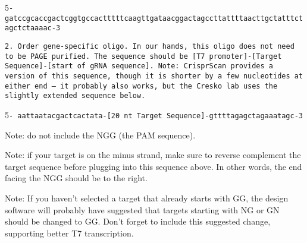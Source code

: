 \documentclass[
  letterpaper,
  DIV=11,
  numbers=noendperiod]{scrreprt}
\begin{document}
5\texttt{-gatccgcaccgactcggtgccactttttcaagttgataacggactagccttattttaacttgctatttctagctctaaaac-3}

\begin{verbatim}
2. Order gene-specific oligo. In our hands, this oligo does not need to be PAGE purified. The sequence should be [T7 promoter]-[Target Sequence]-[start of gRNA sequence]. Note: CrisprScan provides a version of this sequence, though it is shorter by a few nucleotides at either end – it probably also works, but the Cresko lab uses the slightly extended sequence below. 
\end{verbatim}

5\texttt{-\ aattaatacgactcactata-{[}20\ nt\ Target\ Sequence{]}-gttttagagctagaaatagc-3}

\begin{tcolorbox}[enhanced jigsaw, toprule=.15mm, breakable, coltitle=black, leftrule=.75mm, title=\textcolor{quarto-callout-note-color}{\faInfo}\hspace{0.5em}{Notes}, bottomrule=.15mm, toptitle=1mm, bottomtitle=1mm, colframe=quarto-callout-note-color-frame, opacityback=0, colback=white, opacitybacktitle=0.6, colbacktitle=quarto-callout-note-color!10!white, rightrule=.15mm, titlerule=0mm, arc=.35mm, left=2mm]

Note: do not include the NGG (the PAM sequence).

Note: if your target is on the minus strand, make sure to reverse
complement the target sequence before plugging into this sequence above.
In other words, the end facing the NGG should be to the right.

Note: If you haven't selected a target that already starts with GG, the
design software will probably have suggested that targets starting with
NG or GN should be changed to GG. Don't forget to include this suggested
change, supporting better T7 transcription.

\end{tcolorbox}
\end{document}
